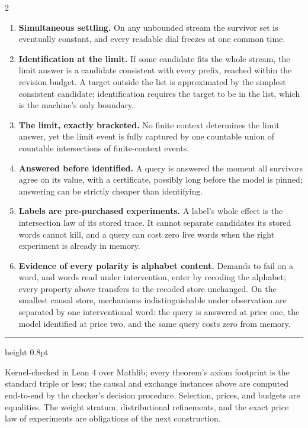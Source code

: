 \documentclass[10pt,a4paper]{article}
\begin{document}
\begin{multicols}{2}
\begin{enumerate}[label=\textbf{P\arabic*.},leftmargin=2.1em,itemsep=0.7pt,parsep=0pt]
\item \textbf{Simultaneous settling.} On any unbounded stream the survivor set is eventually constant, and every readable dial freezes at one common time.
\item \textbf{Identification at the limit.} If some candidate fits the whole stream, the limit answer is a candidate consistent with every prefix, reached within the revision budget. A target outside the list is approximated by the simplest consistent candidate; identification requires the target to be in the list, which is the machine's only boundary.
\item \textbf{The limit, exactly bracketed.} No finite context determines the limit answer, yet the limit event is fully captured by one countable union of countable intersections of finite-context events.
\item \textbf{Answered before identified.} A query is answered the moment all survivors agree on its value, with a certificate, possibly long before the model is pinned; answering can be strictly cheaper than identifying.
\item \textbf{Labels are pre-purchased experiments.} A label's whole effect is the intersection law of its stored trace. It cannot separate candidates its stored words cannot kill, and a query can cost zero live words when the right experiment is already in memory.
\item \textbf{Evidence of every polarity is alphabet content.} Demands to fail on a word, and words read under intervention, enter by recoding the alphabet; every property above transfers to the recoded store unchanged. On the smallest causal store, mechanisms indistinguishable under observation are separated by one interventional word: the query is answered at price one, the model identified at price two, and the same query costs zero from memory.
\end{enumerate}
\end{multicols}

\vspace{-2pt}
{\color{ink}\hrule height 0.8pt}
\vspace{3pt}
{\scriptsize\color{grey} Kernel-checked in Lean 4 over Mathlib; every theorem's axiom footprint is the standard triple or less; the causal and exchange instances above are computed end-to-end by the checker's decision procedure. Selection, prices, and budgets are equalities. The weight stratum, distributional refinements, and the exact price law of experiments are obligations of the next construction.}
\end{document}
